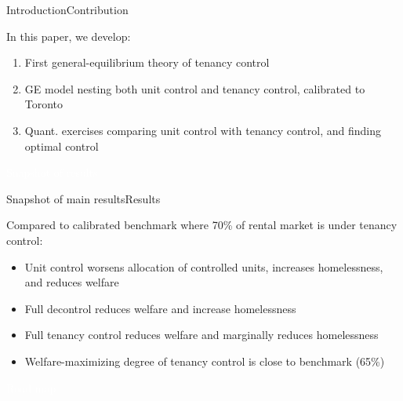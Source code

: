\documentclass[11pt,aspectratio=169]{beamer}
\begin{document}
\begin{frame}{Introduction}{Contribution}

In this paper, we develop:
\begin{enumerate}
    \item First general-equilibrium theory of tenancy control
    \item GE model nesting both unit control and tenancy control, calibrated to Toronto
    \item Quant. exercises comparing unit control with tenancy control, and finding optimal control
\end{enumerate}

\end{frame}

{
\begin{frame}{}

\centering \Large
\textcolor{white}{Snapshot of results}
    
\end{frame}

}

\begin{frame}{Snapshot of main results}{Results}

Compared to calibrated benchmark where 70\% of rental market is under tenancy control:
\begin{itemize}
    \item Unit control worsens allocation of controlled units, increases homelessness, and reduces welfare
    \item Full decontrol reduces welfare and increase homelessness
    \item Full tenancy control reduces welfare and marginally reduces homelessness
    \item Welfare-maximizing degree of tenancy control is close to benchmark (65\%)
\end{itemize}

\end{frame}

{
\begin{frame}{}

\centering \Large
\textcolor{white}{Road map}
    
\end{frame}

}
    
\end{document}
